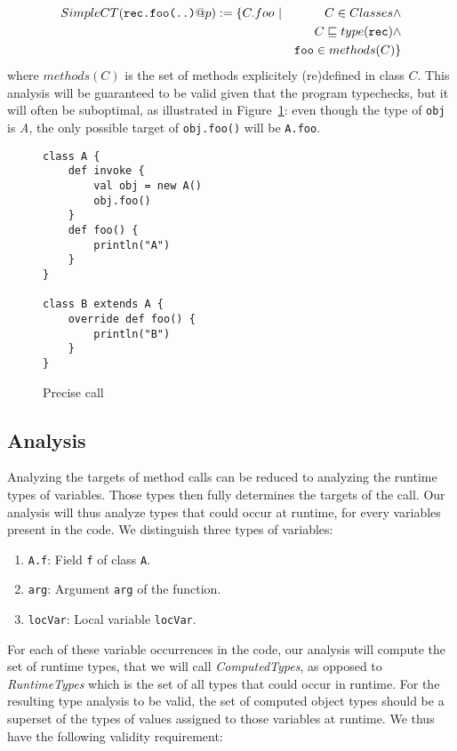 \begin{eqnarray*}
        SimpleCT(\verb/rec.foo(..)/@p) := \{C.foo ~ &|& C \in Classes \land \\
        && C \subtypeeq type(\verb/rec/) \land \\
        && \verb/foo/ \in methods(C) \}
\end{eqnarray*}
where $methods(C)$ is the set of methods explicitely (re)defined in class $C$.
This analysis will be guaranteed to be valid given that the program typechecks,
but it will often be suboptimal, as illustrated in
Figure~\ref{fig:ta:example2}: even though the type of \verb/obj/ is \emph{A},
the only possible target of \verb/obj.foo()/ will be \verb/A.foo/.

\begin{figure}[h]
    \centering

\begin{lstlisting}
class A {
    def invoke {
        val obj = new A()
        obj.foo()
    }
    def foo() {
        println("A")
    }
}

class B extends A {
    override def foo() {
        println("B")
    }
}
\end{lstlisting}

    \caption{Precise call}
    \label{fig:ta:example2}
\end{figure}

\subsection{Analysis}
Analyzing the targets of method calls can be reduced to analyzing the runtime
types of variables. Those types then fully determines the targets of the call.
Our analysis will thus analyze types that could occur at runtime, for every
variables present in the code. We distinguish three types of variables:
\begin{enumerate}
    \item \verb/A.f/: Field \verb/f/ of class \verb/A/.
    \item \verb/arg/: Argument \verb/arg/ of the function.
    \item \verb/locVar/: Local variable \verb/locVar/.
\end{enumerate}

For each of these variable occurrences in the code, our analysis will compute
the set of runtime types, that we will call \emph{ComputedTypes}, as opposed to
\emph{RuntimeTypes} which is the set of all types that could occur in runtime.
For the resulting type analysis to be valid, the set of computed object types
should be a superset of the types of values assigned to those variables at
runtime.  We thus have the following validity requirement:

